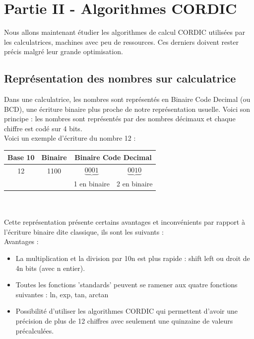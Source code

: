 \documentclass{article}
\begin{document}
\section*{Partie II - Algorithmes CORDIC}

Nous allons maintenant étudier les algorithmes de calcul CORDIC utilisées par les calculatrices, machines avec peu de ressources. Ces derniers doivent rester précis malgré leur grande optimisation.

\subsection*{Représentation des nombres sur calculatrice}

Dans une calculatrice, les nombres sont représentés en Binaire Code Decimal (ou BCD), une écriture binaire plus proche de notre représentation usuelle. Voici son principe : les nombres sont représentés par des nombres décimaux et chaque chiffre est codé sur 4 bits. \\

Voici un exemple d'écriture du nombre 12 : \\

\begin{tabular}{ c | c | c c }
    \label{exemple_de_representation_pour_12}
   Base 10 & Binaire &   \multicolumn{2}{c}{Binaire Code Decimal}\\ \hline
    12 & 1100 & $\underbrace{0001}$ & $\underbrace{0010}$ \\
    & & 1 en binaire & 2 en binaire \\
 \end{tabular} \\ \\ 

Cette représentation présente certains avantages et inconvénients par rapport à l'écriture binaire dite classique, ils sont les suivants : \\

Avantages :
\begin{itemize}
    \item La multiplication et la division par 10n est plus rapide : shift left ou droit de 4n bits (avec n entier).
    \item Toutes les fonctions 'standards' peuvent se ramener aux quatre fonctions suivantes :  ln, exp, tan, arctan
    \item Possibilité d'utiliser les algorithmes CORDIC qui permettent d'avoir une précision de plus de 12 chiffres avec seulement une quinzaine de valeurs précalculées.
\end{itemize}
\end{document}
